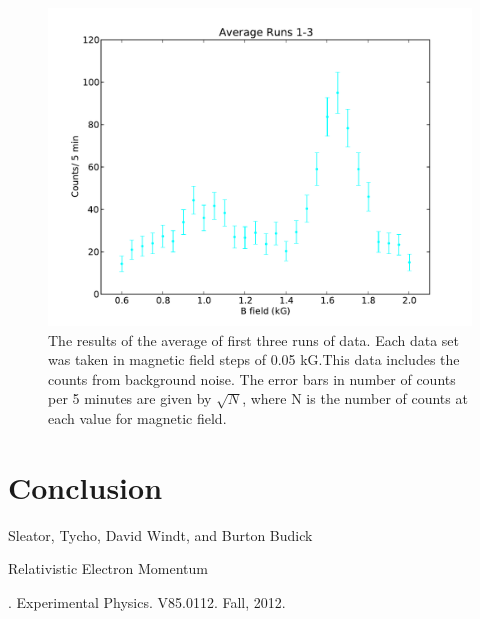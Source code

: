 \begin{figure}[H]
\begin{center}
\includegraphics[width=6 in]{figure4.pdf}
\caption{The results of the average  of first three runs of data. Each data set was taken in magnetic field steps of 0.05 kG.This data includes the counts from background noise. The error bars in number of counts per 5 minutes are given by $\sqrt{N}$, where N is the number of counts at each value for magnetic field. }
\end{center}
\end{figure}
\section{Conclusion}

\begin{thebibliography}{99}
Sleator, Tycho, David Windt, and Burton Budick \begin{em}Relativistic Electron Momentum\end{em}. Experimental Physics. V85.0112. Fall, 2012.
\end{thebibliography}

